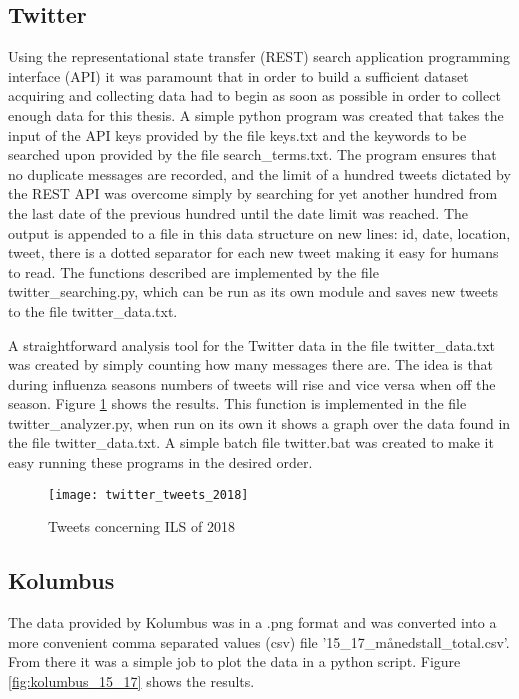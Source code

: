 \subsection{Twitter}
Using the representational state transfer (REST) search application programming interface (API) it was paramount that in order to build a sufficient dataset acquiring and collecting data had to begin as soon as possible in order to collect enough data for this thesis. A simple python program was created that takes the input of the API keys provided by the file keys.txt and the keywords to be searched upon provided by the file search_terms.txt. The program ensures that no duplicate messages are recorded, and the limit of a hundred tweets dictated by the REST API was overcome simply by searching for yet another hundred from the last date of the previous hundred until the date limit was reached.
The output is appended to a file in this data structure on new lines: id, date, location, tweet, there is a dotted separator for each new tweet making it easy for humans to read. The functions described are implemented by the file twitter_searching.py, which can be run as its own module and saves new tweets to the file twitter_data.txt.

A straightforward analysis tool for the Twitter data in the file twitter_data.txt was created by simply counting how many messages there are. The idea is that during influenza seasons numbers of tweets will rise and vice versa when off the season. Figure \ref{fig:twitterAnal} shows the results. This function is implemented in the file twitter_analyzer.py, when run on its own it shows a graph over the data found in the file twitter_data.txt. A simple batch file twitter.bat was created to make it easy running these programs in the desired order.

\begin{figure}[ht]
\texttt{[image: twitter\_tweets\_2018]}
\centering
\caption{Tweets concerning ILS of 2018}
\label{fig:twitterAnal}
\end{figure}

\subsection{Kolumbus}
The data provided by Kolumbus was in a .png format and was converted into a more convenient comma separated values (csv) file '15_17_månedstall_total.csv'. From there it was a simple job to plot the data in a python script. Figure \ref{fig:kolumbus_15_17} shows the results.

